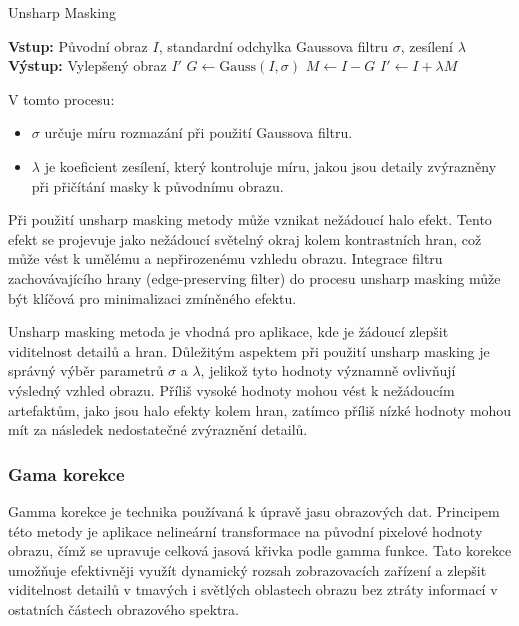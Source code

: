 \documentclass[male,czech,api_ing]{thesis}
\begin{document}
\begin{algorithm}
    \caption{Unsharp Masking}
    \begin{algorithmic}[1]
        \State \textbf{Vstup:} Původní obraz $I$, standardní odchylka Gaussova filtru $\sigma$, zesílení $\lambda$
        \State \textbf{Výstup:} Vylepšený obraz $I'$
        \State $G \gets \text{Gauss}(I, \sigma)$ 
        \State $M \gets I - G$ 
        \State $I' \gets I + \lambda M$ 
    \end{algorithmic}
\end{algorithm}

V tomto procesu:
\begin{itemize}
    \item $\sigma$ určuje míru rozmazání při použití Gaussova filtru.
    \item $\lambda$ je koeficient zesílení, který kontroluje míru, jakou jsou detaily zvýrazněny při přičítání masky k původnímu obrazu.
\end{itemize}

Při použití unsharp masking metody může vznikat nežádoucí halo efekt. Tento efekt se projevuje jako nežádoucí světelný okraj kolem kontrastních hran, což může vést k umělému a nepřirozenému vzhledu obrazu. Integrace filtru zachovávajícího hrany (edge-preserving filter) do procesu unsharp masking může být klíčová pro minimalizaci zmíněného efektu. \cite{UnsharpMasking}

Unsharp masking metoda je vhodná pro aplikace, kde je žádoucí zlepšit viditelnost detailů a hran. Důležitým aspektem při použití unsharp masking je správný výběr parametrů $\sigma$ a $\lambda$, jelikož tyto hodnoty významně ovlivňují výsledný vzhled obrazu. Příliš vysoké hodnoty mohou vést k nežádoucím artefaktům, jako jsou halo efekty kolem hran, zatímco příliš nízké hodnoty mohou mít za následek nedostatečné zvýraznění detailů.

\subsubsection{Gama korekce}
Gamma korekce je technika používaná k úpravě jasu obrazových dat. Principem této metody je aplikace nelineární transformace na původní pixelové hodnoty obrazu, čímž se upravuje celková jasová křivka podle gamma funkce. Tato korekce umožňuje efektivněji využít dynamický rozsah zobrazovacích zařízení a zlepšit viditelnost detailů v tmavých i světlých oblastech obrazu bez ztráty informací v ostatních částech obrazového spektra. \cite{PreprocessingBook}
\end{document}
